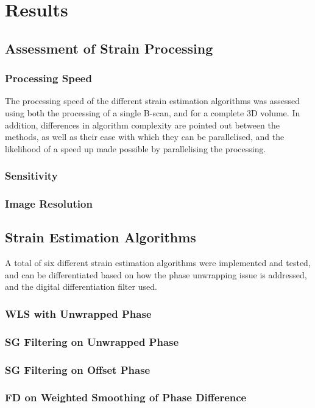 \chapter{Results}

\section{Assessment of Strain Processing}
\subsection{Processing Speed}
The processing speed of the different strain estimation algorithms was assessed using both the processing of a single B-scan, and for a complete 3D volume. In addition, differences in algorithm complexity are pointed out between the methods, as well as their ease with which they can be parallelised, and the likelihood of a speed up made possible by parallelising the processing.
\subsection{Sensitivity}
\subsection{Image Resolution}


\section{Strain Estimation Algorithms}
A total of six different strain estimation algorithms were implemented and tested, and can be differentiated based on how the phase unwrapping issue is addressed, and the digital differentiation filter used. 
\subsection{WLS with Unwrapped Phase}
\subsection{SG Filtering on Unwrapped Phase}
\subsection{SG Filtering on Offset Phase}
\subsection{FD on Weighted Smoothing of Phase Difference}
